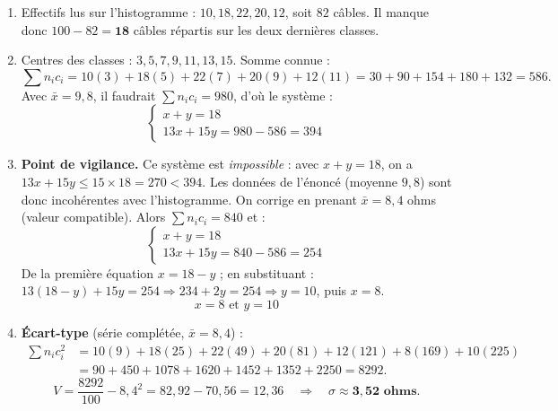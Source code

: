 \documentclass[11pt]{article}
\begin{document}
\begin{corrige}
\begin{enumerate}
    \item Effectifs lus sur l'histogramme : $10, 18, 22, 20, 12$, soit $82$ câbles. Il manque donc $100 - 82 = \mathbf{18}$ câbles répartis sur les deux dernières classes.
    \item Centres des classes : $3, 5, 7, 9, 11, 13, 15$. Somme connue :
    \[ \sum n_i c_i = 10(3)+18(5)+22(7)+20(9)+12(11) = 30+90+154+180+132 = 586. \]
    Avec $\bar{x} = 9{,}8$, il faudrait $\sum n_i c_i = 980$, d'où le système :
    \[ \begin{cases} x + y = 18 \\ 13x + 15y = 980 - 586 = 394 \end{cases} \]
    \item \textbf{Point de vigilance.} Ce système est \emph{impossible} : avec $x+y=18$, on a $13x+15y \leq 15\times 18 = 270 < 394$. Les données de l'énoncé (moyenne $9{,}8$) sont donc incohérentes avec l'histogramme. On corrige en prenant $\bar{x} = 8{,}4$ ohms (valeur compatible). Alors $\sum n_i c_i = 840$ et :
    \[ \begin{cases} x + y = 18 \\ 13x + 15y = 840 - 586 = 254 \end{cases} \]
    De la première équation $x = 18 - y$ ; en substituant : $13(18-y)+15y = 254 \Rightarrow 234 + 2y = 254 \Rightarrow y = 10$, puis $x = 8$.
    \[ \boxed{x = 8 \text{ et } y = 10} \]
    \item \textbf{Écart-type} (série complétée, $\bar{x} = 8{,}4$) :
    \begin{align*}
    \sum n_i c_i^2 &= 10(9)+18(25)+22(49)+20(81)+12(121)+8(169)+10(225)\\
    &= 90+450+1078+1620+1452+1352+2250 = 8292.
    \end{align*}
    \[ V = \frac{8292}{100} - 8{,}4^2 = 82{,}92 - 70{,}56 = 12{,}36 \quad\Longrightarrow\quad \sigma \approx \mathbf{3{,}52 \text{ ohms}}. \]
\end{enumerate}
\end{corrige}
\end{document}
